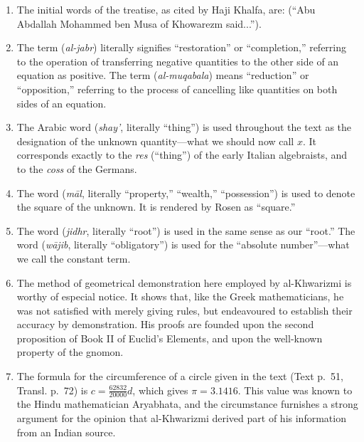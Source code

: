 \begin{enumerate}

\item The initial words of the treatise, as cited by Haji Khalfa, are:  (``Abu Abdallah Mohammed ben Musa of Khowarezm said...'').

\item The term  (\textit{al-jabr}) literally signifies ``restoration'' or ``completion,'' referring to the operation of transferring negative quantities to the other side of an equation as positive. The term  (\textit{al-muqabala}) means ``reduction'' or ``opposition,'' referring to the process of cancelling like quantities on both sides of an equation.

\item The Arabic word  (\textit{shay'}, literally ``thing'') is used throughout the text as the designation of the unknown quantity---what we should now call $x$. It corresponds exactly to the \textit{res} (``thing'') of the early Italian algebraists, and to the \textit{coss} of the Germans.

\item The word  (\textit{māl}, literally ``property,'' ``wealth,'' ``possession'') is used to denote the square of the unknown. It is rendered by Rosen as ``square.''

\item The word  (\textit{jidhr}, literally ``root'') is used in the same sense as our ``root.'' The word  (\textit{wājib}, literally ``obligatory'') is used for the ``absolute number''---what we call the constant term.

\item The method of geometrical demonstration here employed by al-Khwarizmi is worthy of especial notice. It shows that, like the Greek mathematicians, he was not satisfied with merely giving rules, but endeavoured to establish their accuracy by demonstration. His proofs are founded upon the second proposition of Book II of Euclid's Elements, and upon the well-known property of the gnomon.

\item The formula for the circumference of a circle given in the text (Text p.~51, Transl. p.~72) is $c = \frac{62832}{20000}d$, which gives $\pi = 3.1416$. This value was known to the Hindu mathematician Aryabhata, and the circumstance furnishes a strong argument for the opinion that al-Khwarizmi derived part of his information from an Indian source.


\end{enumerate}
